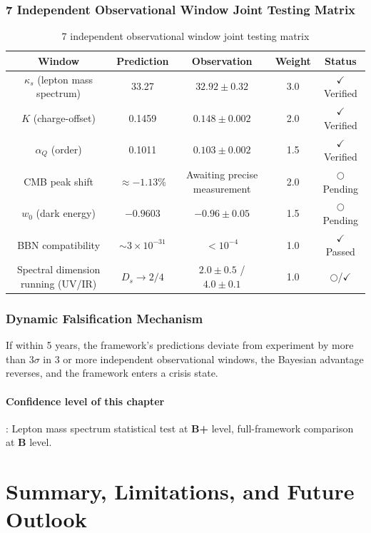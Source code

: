 \documentclass[12pt,a4paper,twocolumn]{article}
\begin{document}
\subsubsection{7 Independent Observational Window Joint Testing Matrix}
\begin{table}[H]
\centering
\footnotesize
\caption{7 independent observational window joint testing matrix}
\begin{tabular}{c|c|c|c|c}
\hline
\textbf{Window} & \textbf{Prediction} & \textbf{Observation} & \textbf{Weight} & \textbf{Status} \\
\hline
$\kappa_s$ (lepton mass spectrum) & 33.27 & $32.92\pm0.32$ & 3.0 & $\checkmark$ Verified \\
$K$ (charge-offset) & 0.1459 & $0.148\pm0.002$ & 2.0 & $\checkmark$ Verified \\
$\alpha_Q$ (order) & 0.1011 & $0.103\pm0.002$ & 1.5 & $\checkmark$ Verified \\
CMB peak shift & $\approx -1.13\%$ & Awaiting precise measurement & 2.0 & $\bigcirc$ Pending \\
$w_0$ (dark energy) & $-0.9603$ & $-0.96\pm0.05$ & 1.5 & $\bigcirc$ Pending \\
BBN compatibility & $\sim\!3\times 10^{-31}$ & $<10^{-4}$ & 1.0 & $\checkmark$ Passed \\
Spectral dimension running (UV/IR) & $D_s\to2/4$ & $2.0\pm0.5$ / $4.0\pm0.1$ & 1.0 & $\bigcirc$/$\checkmark$ \\
\hline
\end{tabular}
\end{table}

\subsubsection{Dynamic Falsification Mechanism}
If within 5 years, the framework's predictions deviate from experiment by more than $3\sigma$ in 3 or more independent observational windows, the Bayesian advantage reverses, and the framework enters a crisis state.

\paragraph{Confidence level of this chapter}: Lepton mass spectrum statistical test at \textbf{B+} level, full-framework comparison at \textbf{B} level.

\section{Summary, Limitations, and Future Outlook}
\end{document}
